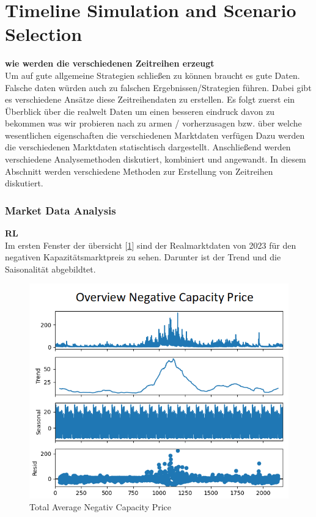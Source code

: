 
\section{Timeline Simulation and Scenario Selection}
\textbf{wie werden die verschiedenen Zeitreihen erzeugt}\\
Um auf gute allgemeine Strategien schließen zu können braucht es gute Daten. Falsche daten würden auch zu falschen Ergebnissen/Strategien führen.
Dabei gibt es verschiedene Ansätze diese Zeitreihendaten zu erstellen. Es folgt zuerst ein Überblick über die realwelt Daten um einen besseren eindruck
davon zu bekommen was wir probieren nach zu armen / vorherzusagen bzw. über welche wesentlichen eigenschaften die verschiedenen Marktdaten verfügen
Dazu werden die verschiedenen Marktdaten statischtisch dargestellt.
Anschließend werden verschiedene Analysemethoden diskutiert, kombiniert und angewandt.
In diesem Abschnitt werden verschiedene Methoden zur Erstellung von Zeitreihen diskutiert.
\subsubsection{Market Data Analysis}
\textbf{RL}\\
Im ersten Fenster der übersicht [\ref{fig:Overview Average Negativ Capacity Price}] sind der Realmarktdaten von 2023 für den negativen Kapazitätsmarktpreis zu sehen.
Darunter ist der Trend und die Saisonalität abgebildtet.

\begin{figure}[!h]
	\includegraphics[width=0.7\linewidth]{pictures/capacityData_overview.png}
	\caption{Total Average Negativ Capacity Price}
	\label{fig:Overview Average Negativ Capacity Price}
\end{figure}

